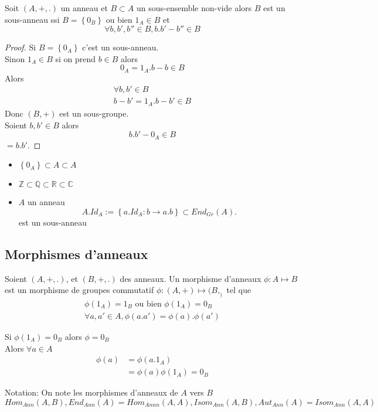 \documentclass[../main.tex]{subfiles}
\begin{document}
\begin{lemma}\label{lemma:critere_de_sous_anneau}
	Soit $(A, + , .)$ un anneau et $B \subset A$ un sous-ensemble non-vide alors $B$ est un sous-anneau ssi $B = \left\{ 0_B \right\} $ ou bien $1_A \in B$ et
	\[ 
	\forall b, b',b'' \in B, b.b' - b'' \in B
	\]
	
\end{lemma}
\begin{proof}
Si $B = \left\{ 0_A \right\} $ c'est un sous-anneau.\\
Sinon $1_A \in B$ si on prend $b \in B$ alors
\[ 
0_A =1_A . b -b \in B
\]
Alors
\begin{align*}
\forall b,b' \in B\\
b -b' = 1_A. b -b' \in B
\end{align*}
Donc $(B,+)$ est un sous-groupe.\\
Soient $b,b' \in B$ alors
\[ 
b.b' - 0_A \in B
\]
$=b.b'$.

\end{proof}
\begin{exemple}
\begin{itemize}
\item $ \left\{ 0_A \right\} \subset A \subset A$ 
\item $\mathbb{Z} \subset \mathbb{Q} \subset \mathbb{R} \subset \mathbb{C}$ 
\item $A$ un anneau
	\[ 
		A. Id_A := \left\{ a. Id_A : b \to a.b \right\} \subset End_{Gr} ( A).	
	\]
	est un sous-anneau
\end{itemize}

\end{exemple}

\subsection{Morphismes d'anneaux}
\begin{defn}\label{defn:morphisme_d_anneaux}
	Soient $(A, + , .)$, et $(B, +, .)$ des anneaux. Un morphisme d'anneaux $\phi : A \mapsto B$ est un morphisme de groupes commutatif $\phi: ( A,+) \mapsto ( B, _)$ tel que
	\begin{align*}
		\phi(1_A) = 1_B \text{ ou bien  } \phi(1_A) = 0_B\\
		\forall a, a' \in A, \phi(a.a') = \phi(a) . \phi(a')
	\end{align*}
\end{defn}
\begin{rmq}
	Si $ \phi(1_A) = 0_B$ alors $\phi = 0_B$ \\
	Alors $\forall a \in A$
	 \begin{align*}
		 \phi(a) &= \phi(a.1_A)\\
			 &= \phi(a) \phi(1_A) = 0_B
	\end{align*}
\end{rmq}
Notation:
On note les morphismes d'anneaux de $A$ vers $B$ 
\[ 
	Hom_{Ann} ( A,B), End_{Ann} ( A)= Hom_{Annn} ( A,A), Isom_{Ann} ( A,B), Aut_{Ann} ( A) = Isom_{Ann} (A,A)
\]
\end{document}
